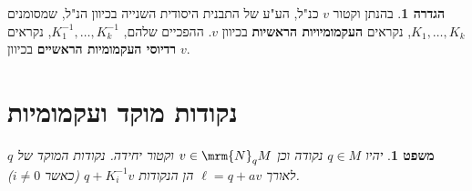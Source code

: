 \documentclass{article}
\newtheorem{theorem}{משפט}
\theoremstyle{definition}
\newtheorem*{definition*}{הגדרה}
\begin{document}
	\begin{definition*}
		בהנתן וקטור \(v\) כנ"ל,
		הע"ע של התבנית היסודית השנייה בכיוון הנ"ל,
		שמסומנים
		\(K_1,\dotsc,K_k\),
		נקראים \textbf{העקמומיויות הראשיות} בכיוון \(v\).
		ההפכיים שלהם,
		\(K_1^{-1},\dotsc,K_k^{-1}\),
		נקראים \textbf{רדיוסי העקמומיות הראשיים} בכיוון \(v\).
	\end{definition*}




	\section{נקודות מוקד ועקמומיות}
	
	\begin{theorem}\label{focal-curvature}
		יהיו
		\(q\in M\)
		נקודה וכן
		\(v\in\mrm{N}_q M\)
		וקטור יחידה.
		נקודות המוקד של \(q\) לאורך
		\(\ell = q+av\)
		הן הנקודות
		\(q + K_i^{-1} v\)
		(כאשר \(i\neq 0\)).
	\end{theorem}
\end{document}
